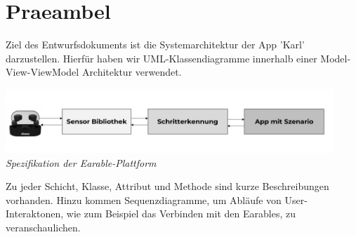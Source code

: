 \documentclass[../entwurf.tex]{subfiles}
\begin{document}
\maketitle
\tableofcontents


\clearpage
\section{Praeambel}
Ziel des Entwurfsdokuments ist die Systemarchitektur der App 'Karl' darzustellen. Hierfür haben wir UML-Klassendiagramme innerhalb einer Model-View-ViewModel Architektur verwendet.

	\begin{center}
		\includegraphics[page=1,width=350pt,keepaspectratio]{../graphics/Praeambel/YHB_Project_Pic.png}
		\textit{Spezifikation der Earable-Plattform }
	\end{center}

Zu jeder Schicht, Klasse, Attribut und Methode sind kurze Beschreibungen vorhanden. Hinzu kommen Sequenzdiagramme, um Abläufe von User-Interaktonen, wie zum Beispiel das Verbinden mit den Earables, zu veranschaulichen.
\end{document}
